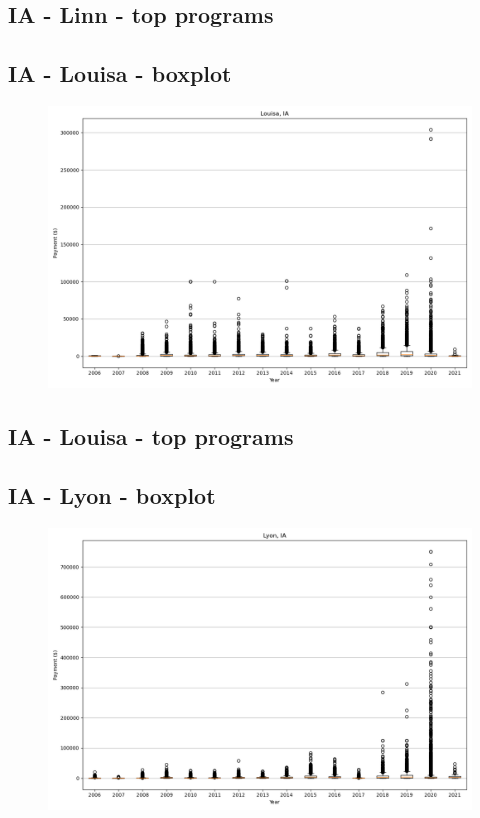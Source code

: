 \subsection*{IA - Linn - top programs}

\newpage
\subsection*{IA - Louisa - boxplot}
\begin{figure}[h]
\centering
\includegraphics[width=7in]{../output/boxplots/counties/Louisa-IA_boxplot.png}
\end{figure}


\subsection*{IA - Louisa - top programs}

\newpage
\subsection*{IA - Lyon - boxplot}
\begin{figure}[h]
\centering
\includegraphics[width=7in]{../output/boxplots/counties/Lyon-IA_boxplot.png}
\end{figure}


